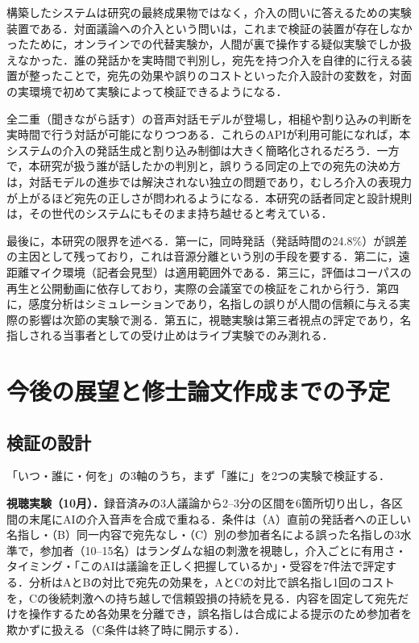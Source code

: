 \documentclass[a4paper]{ltjsarticle}
\begin{document}
構築したシステムは研究の最終成果物ではなく，介入の問いに答えるための実験装置である．対面議論への介入という問いは，これまで検証の装置が存在しなかったために，オンラインでの代替実験か，人間が裏で操作する疑似実験でしか扱えなかった．誰の発話かを実時間で判別し，宛先を持つ介入を自律的に行える装置が整ったことで，宛先の効果や誤りのコストといった介入設計の変数を，対面の実環境で初めて実験によって検証できるようになる．

全二重（聞きながら話す）の音声対話モデルが登場し，相槌や割り込みの判断を実時間で行う対話が可能になりつつある．これらのAPIが利用可能になれば，本システムの介入の発話生成と割り込み制御は大きく簡略化されるだろう．一方で，本研究が扱う誰が話したかの判別と，誤りうる同定の上での宛先の決め方は，対話モデルの進歩では解決されない独立の問題であり，むしろ介入の表現力が上がるほど宛先の正しさが問われるようになる．本研究の話者同定と設計規則は，その世代のシステムにもそのまま持ち越せると考えている．

最後に，本研究の限界を述べる．第一に，同時発話（発話時間の24.8\%）が誤差の主因として残っており，これは音源分離という別の手段を要する．第二に，遠距離マイク環境（記者会見型）は適用範囲外である．第三に，評価はコーパスの再生と公開動画に依存しており，実際の会議室での検証をこれから行う．第四に，感度分析はシミュレーションであり，名指しの誤りが人間の信頼に与える実際の影響は次節の実験で測る．第五に，視聴実験は第三者視点の評定であり，名指しされる当事者としての受け止めはライブ実験でのみ測れる．

\section{今後の展望と修士論文作成までの予定}
\subsection{検証の設計}
「いつ・誰に・何を」の3軸のうち，まず「誰に」を2つの実験で検証する．

\textbf{視聴実験（10月）．}録音済みの3人議論から2--3分の区間を6箇所切り出し，各区間の末尾にAIの介入音声を合成で重ねる．条件は（A）直前の発話者への正しい名指し・（B）同一内容で宛先なし・（C）別の参加者名による誤った名指しの3水準で，参加者（10--15名）はランダムな組の刺激を視聴し，介入ごとに有用さ・タイミング・「このAIは議論を正しく把握しているか」・受容を7件法で評定する．分析はAとBの対比で宛先の効果を，AとCの対比で誤名指し1回のコストを，Cの後続刺激への持ち越しで信頼毀損の持続を見る．内容を固定して宛先だけを操作するため各効果を分離でき，誤名指しは合成による提示のため参加者を欺かずに扱える（C条件は終了時に開示する）．
\end{document}
